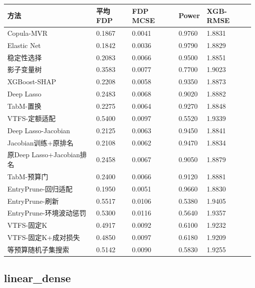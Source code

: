 \documentclass[UTF8,11pt,a4paper]{ctexart}
\begin{document}
{\def\LTcaptype{none} %
{
\footnotesize
\begin{longtable}[]{@{}lllll@{}}
\toprule\noalign{}
方法 & 平均FDP & FDP MCSE & Power & XGB-RMSE \\
\midrule\noalign{}
\endhead
\bottomrule\noalign{}
\endlastfoot
Copula-MVR & 0.1867 & 0.0041 & 0.9760 & 1.8831 \\
Elastic Net & 0.1842 & 0.0036 & 0.9790 & 1.8829 \\
稳定性选择 & 0.2083 & 0.0066 & 0.9500 & 1.8851 \\
影子变量树 & 0.3583 & 0.0077 & 0.7700 & 1.9023 \\
XGBoost-SHAP & 0.2208 & 0.0058 & 0.9350 & 1.8873 \\
Deep Lasso & 0.2483 & 0.0068 & 0.9020 & 1.8882 \\
TabM-置换 & 0.2275 & 0.0064 & 0.9270 & 1.8848 \\
VTFS-定额适配 & 0.5400 & 0.0097 & 0.5520 & 1.9339 \\
Deep Lasso-Jacobian & 0.2125 & 0.0063 & 0.9450 & 1.8841 \\
Jacobian训练+原排名 & 0.2108 & 0.0062 & 0.9470 & 1.8834 \\
原Deep Lasso+Jacobian排名 & 0.2458 & 0.0067 & 0.9050 & 1.8879 \\
TabM-预算门 & 0.2400 & 0.0066 & 0.9120 & 1.8881 \\
EntryPrune-回归适配 & 0.1950 & 0.0051 & 0.9660 & 1.8830 \\
EntryPrune-刷新 & 0.5517 & 0.0106 & 0.5380 & 1.9405 \\
EntryPrune-环境波动惩罚 & 0.5300 & 0.0116 & 0.5640 & 1.9357 \\
VTFS-固定K & 0.4917 & 0.0092 & 0.6100 & 1.9232 \\
VTFS-固定K+成对损失 & 0.4850 & 0.0097 & 0.6180 & 1.9209 \\
等预算随机子集搜索 & 0.5142 & 0.0090 & 0.5830 & 1.9255 \\
\end{longtable}
}
}

\subsection{linear\_dense}\label{linear_dense}
\end{document}
